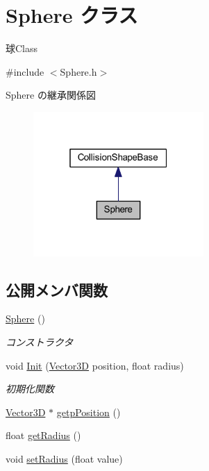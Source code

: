 \hypertarget{class_sphere}{}\section{Sphere クラス}
\label{class_sphere}


球\+Class  




{\ttfamily \#include $<$Sphere.\+h$>$}



Sphere の継承関係図\nopagebreak
\begin{figure}[H]
\begin{center}
\leavevmode
\includegraphics[width=184pt]{class_sphere__inherit__graph}
\end{center}
\end{figure}
\subsection*{公開メンバ関数}
\begin{DoxyCompactItemize}
\item 
\mbox{\hyperlink{class_sphere_a890a63ff583cb88e7ec4e840b4ef5eb9}{Sphere}} ()
\begin{DoxyCompactList}\small\item\em コンストラクタ \end{DoxyCompactList}\item 
void \mbox{\hyperlink{class_sphere_aa0c93894c5dad170bd65f1cec3493c37}{Init}} (\mbox{\hyperlink{class_vector3_d}{Vector3D}} position, float radius)
\begin{DoxyCompactList}\small\item\em 初期化関数 \end{DoxyCompactList}\item 
\mbox{\hyperlink{class_vector3_d}{Vector3D}} $\ast$ \mbox{\hyperlink{class_sphere_a9fd8492659b335541af8a2f56f14e1b1}{getp\+Position}} ()
\item 
float \mbox{\hyperlink{class_sphere_a330dd34c7c7b6dfff106c4c71ec80028}{get\+Radius}} ()
\item 
void \mbox{\hyperlink{class_sphere_ad813f5d3e9da96cf1111aedec4ec9b5f}{set\+Radius}} (float value)
\end{DoxyCompactItemize}
